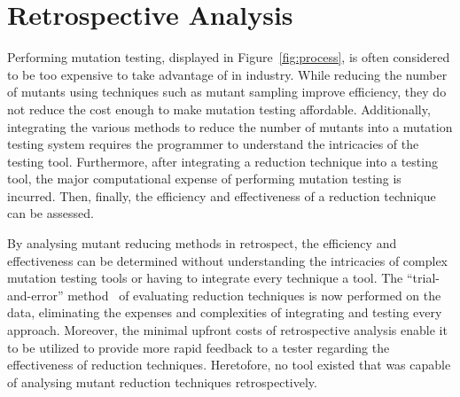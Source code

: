 \section{Retrospective Analysis}

Performing mutation testing, displayed in Figure~\ref{fig:process}, is often considered to
be too expensive to take advantage of in industry. While reducing the number of mutants
using techniques such as mutant sampling improve efficiency, they do not reduce the cost
enough to make mutation testing affordable. Additionally, integrating the various methods
to reduce the number of mutants into a mutation testing system requires the programmer to
understand the intricacies of the testing tool. Furthermore, after integrating a reduction
technique into a testing tool, the major computational expense of performing mutation testing
is incurred. Then, finally, the efficiency and effectiveness of a reduction technique can be
assessed.

By analysing mutant reducing methods in retrospect, the efficiency and effectiveness
can be determined without understanding the intricacies of complex mutation testing tools
or having to integrate every technique a tool. The ``trial-and-error'' method~\cite{edwards2004using}
of evaluating reduction techniques is now performed on the data, eliminating the expenses and
complexities of integrating and testing every approach. Moreover, the minimal upfront costs
of retrospective analysis enable it to be utilized to provide more rapid feedback to a tester
regarding the effectiveness of reduction techniques. Heretofore, no tool existed that
was capable of analysing mutant reduction techniques retrospectively.

